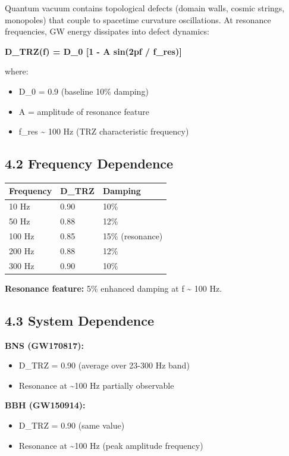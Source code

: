 \documentclass[11pt]{article}
\begin{document}
Quantum vacuum contains topological defects (domain walls, cosmic strings, monopoles) that couple to spacetime curvature oscillations. At resonance frequencies, GW energy dissipates into defect dynamics:

\textbf{D\_TRZ(f) = D\_0  [1 - A sin(2pf / f\_res)]}

where:

\begin{itemize}
  \item D\_0 = 0.9 (baseline 10\% damping)
  \item A = amplitude of resonance feature
  \item f\_res \textasciitilde{} 100 Hz (TRZ characteristic frequency)
\end{itemize}

\subsection*{4.2 Frequency Dependence}

\begin{center}
\begin{longtable}{lll}
\toprule
Frequency & D\_TRZ & Damping \tabularnewline
\midrule
\endhead
10 Hz & 0.90 & 10\% \tabularnewline
50 Hz & 0.88 & 12\% \tabularnewline
100 Hz & 0.85 & 15\% (resonance) \tabularnewline
200 Hz & 0.88 & 12\% \tabularnewline
300 Hz & 0.90 & 10\% \tabularnewline
\bottomrule
\end{longtable}
\end{center}

\textbf{Resonance feature:} 5\% enhanced damping at f \textasciitilde{} 100 Hz.

\subsection*{4.3 System Dependence}

\textbf{BNS (GW170817):}

\begin{itemize}
  \item D\_TRZ = 0.90 (average over 23-300 Hz band)
  \item Resonance at \textasciitilde{}100 Hz partially observable
\end{itemize}

\textbf{BBH (GW150914):}

\begin{itemize}
  \item D\_TRZ = 0.90 (same value)
  \item Resonance at \textasciitilde{}100 Hz (peak amplitude frequency)
\end{itemize}
\end{document}

